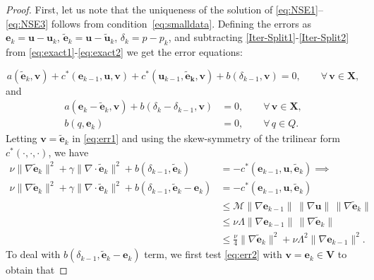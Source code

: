 \documentclass[3p]{elsarticle}
\def\V#1{\mathbf{#1}}
\def\Vt#1{\mathbf{\tilde{#1}}}
\newcommand{\Mbd}{\mathcal{M}}
\newcommand{\DY}[1]{{\color{black}{#1}}}
\begin{document}
%
%
\begin{proof}
First, let us note that the uniqueness of the solution of \eqref{eq:NSE1}--\eqref{eq:NSE3} follows from condition~\eqref{eq:smalldata}.
Defining the errors as $\V{e}_k=\V{u}-\V{u}_k$, $\Vt{e}_k=\V{u}-\Vt{u}_k$, $\delta_k=p-p_k$, and subtracting \eqref{Iter-Split1}-\eqref{Iter-Split2} from \eqref{eq:exact1}-\eqref{eq:exact2} we get the error equations:

\begin{equation}\label{eq:err1}
a(\V{\tilde{e}}_{k},\V{v})
+ c^*(\V{e}_{k-1}, \V{u}, \V{v}) + c^*(\V{u}_{k-1}, \V{\tilde{e}_k}, \V{v}) + b(\delta_{k-1},\V{v}) = 0,
\qquad \forall \, \V{v} \in \V{X},
\end{equation}
and
\begin{equation}\label{eq:err2}
\begin{aligned}
a(\V{e}_{k} - \V{\tilde{e}}_{k}, \V{v}) + b(\delta_k-\delta_{k-1},\V{v}) & = 0, \qquad \forall \, \V{v} \in \V{X}, \\
b(q, \V{e}_{k}) & = 0, \qquad \forall \, q \in Q.
\end{aligned}
\end{equation}
Letting $\V{v}=\Vt{e}_k$ in \eqref{eq:err1} and using the skew-symmetry of the trilinear form $c^*(\cdot,\cdot,\cdot)$, we have
\begin{equation}\label{eq:err3}   
\begin{aligned}
\nu \|\nabla \V{\tilde{e}}_{k} \|^2 
+ \gamma \| \nabla \cdot \V{\tilde{e}}_{k} \|^2 
+  b(\delta_{k-1}, \V{\tilde{e}}_k )
& = - c^*(\V{e}_{k-1}, \V{u}, \Vt{e}_k) \implies \\
\nu \|\nabla \V{\tilde{e}}_{k} \|^2 
+ \gamma \| \nabla \cdot \V{\tilde{e}}_{k} \|^2 
+ b(\delta_{k-1}, \V{\tilde{e}}_k - \V{e}_k)
& = - c^*(\V{e}_{k-1}, \V{u}, \Vt{e}_k) \\
& \le \Mbd \|\nabla \V{e}_{k-1} \|\, \|\nabla \V{u} \| \, \|\nabla \V{\tilde{e}}_{k} \| \\
& \le \nu \Lambda \|\nabla \V{e}_{k-1} \|\, \|\nabla \V{\tilde{e}}_{k} \| \\
& \le \frac{\nu}{4} \|\nabla \V{\tilde{e}}_{k} \|^2 + \nu \Lambda^2 \|\nabla \V{e}_{k-1} \|^2.
\end{aligned}
\end{equation}
To deal with $b(\delta_{k-1}, \V{\tilde{e}}_k - \V{e}_k)$ term, we first test \eqref{eq:err2} with $\V{v} = \V{e}_k \in \V{V}$ to obtain that

\end{proof}
\end{document}
